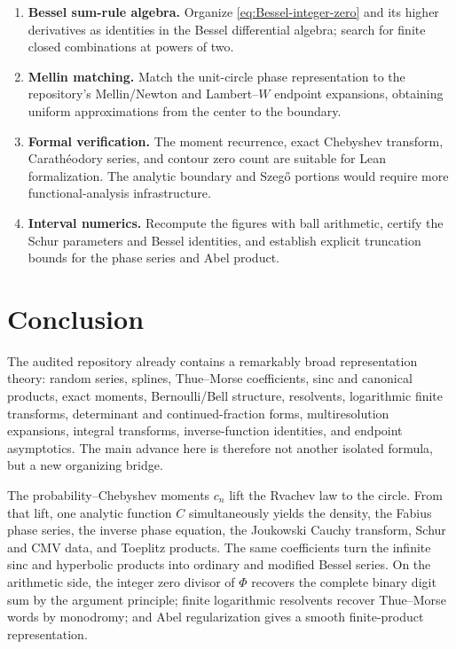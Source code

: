 \documentclass[11pt,oneside]{article}
\theoremstyle{definition}
\begin{document}
\begin{enumerate}
\item \textbf{Bessel sum-rule algebra.} Organize \eqref{eq:Bessel-integer-zero} and its
higher derivatives as identities in the Bessel differential algebra; search for finite
closed combinations at powers of two.

\item \textbf{Mellin matching.} Match the unit-circle phase representation to the repository's
Mellin/Newton and Lambert--\(W\) endpoint expansions, obtaining uniform approximations from
the center to the boundary.

\item \textbf{Formal verification.} The moment recurrence, exact Chebyshev transform,
Carath\'eodory series, and contour zero count are suitable for Lean formalization. The
analytic boundary and Szeg\H{o} portions would require more functional-analysis
infrastructure.

\item \textbf{Interval numerics.} Recompute the figures with ball arithmetic, certify the
Schur parameters and Bessel identities, and establish explicit truncation bounds for the
phase series and Abel product.
\end{enumerate}

\section{Conclusion}
\label{sec:conclusion}

The audited repository already contains a remarkably broad representation theory: random
series, splines, Thue--Morse coefficients, sinc and canonical products, exact moments,
Bernoulli/Bell structure, resolvents, logarithmic finite transforms, determinant and
continued-fraction forms, multiresolution expansions, integral transforms, inverse-function
identities, and endpoint asymptotics. The main advance here is therefore not another
isolated formula, but a new organizing bridge.

The probability--Chebyshev moments \(c_n\) lift the Rvachev law to the circle. From that lift,
one analytic function \(C\) simultaneously yields the density, the Fabius phase series, the
inverse phase equation, the Joukowski Cauchy transform, Schur and CMV data, and Toeplitz
products. The same coefficients turn the infinite sinc and hyperbolic products into ordinary
and modified Bessel series. On the arithmetic side, the integer zero divisor of \(\Phi\)
recovers the complete binary digit sum by the argument principle; finite logarithmic
resolvents recover Thue--Morse words by monodromy; and Abel regularization gives a smooth
finite-product representation.
\end{document}
